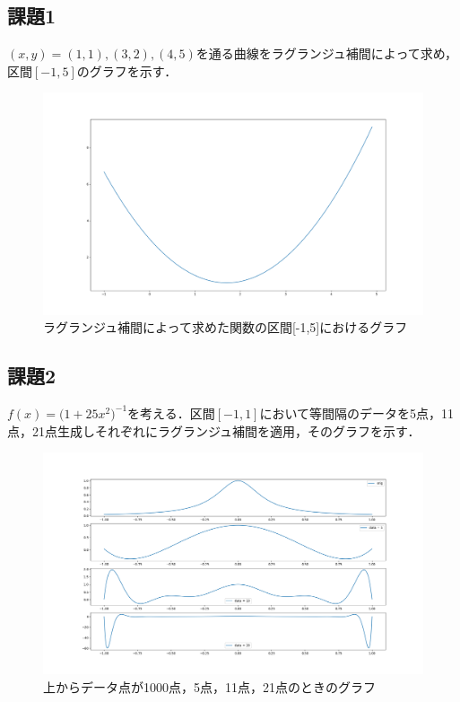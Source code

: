 \documentclass[a4paper, titlepage]{jsarticle}
\begin{document}
	\subsection{課題1}
	$(x,y)=(1,1),(3,2),(4,5)$を通る曲線をラグランジュ補間によって求め，区間$[-1,5]$のグラフを示す．

	\begin{figure}[ht]
		\centering
		\includegraphics[keepaspectratio, scale=0.3]{lagrange1.png}
		\caption{ラグランジュ補間によって求めた関数の区間[-1,5]におけるグラフ}
	\end{figure}

	\subsection{課題2}
	$f(x)={(1+25{x^2}})^{-1}$を考える．区間$[-1,1]$において等間隔のデータを5点，11点，21点生成しそれぞれにラグランジュ補間を適用，そのグラフを示す．

	\begin{figure}[ht]
		\centering
		\includegraphics[keepaspectratio, scale=0.3]{lagrange2.png}
		\caption{上からデータ点が1000点，5点，11点，21点のときのグラフ}
	\end{figure}
\end{document}
